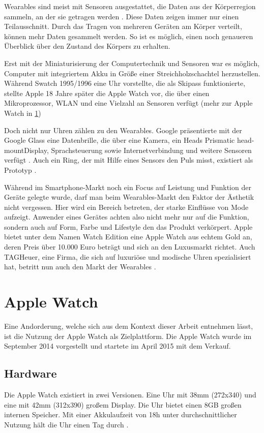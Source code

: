 Wearables sind meist mit Sensoren ausgestattet, die Daten aus der Körperregion sammeln, an der sie getragen werden \cite{4711366}. Diese Daten zeigen immer nur einen Teilausschnitt. Durch das Tragen von mehreren Geräten am Körper verteilt, können mehr Daten gesammelt werden. So ist es möglich, einen noch genaueren Überblick über den Zustand des Körpers zu erhalten\cite{4711366}.

Erst mit der Miniaturisierung der Computertechnik und Sensoren war es möglich, Computer mit integriertem Akku in Größe einer Streichholzschachtel herzustellen. Während Swatch 1995/1996 eine Uhr vorstellte, die als Skipass funktionierte, stellte Apple 18 Jahre später die Apple Watch vor, die über einen Mikroprozessor, WLAN und eine Vielzahl an Sensoren verfügt (mehr zur Apple Watch in \ref{ch:apple-watch})

Doch nicht nur Uhren zählen zu den Wearables. Google präsentierte mit der Google Glass eine Datenbrille, die über eine Kamera, ein Heads \glqq Prismatic head-mount\glqq  Display, Sprachsteuerung sowie Internetverbindung und weitere Sensoren verfügt \cite{Muensterer2014281}. Auch ein Ring, der mit Hilfe eines Sensors den Puls misst, existiert als Prototyp \cite{4711366}.

Während im Smartphone-Markt noch ein Focus auf Leistung und Funktion der Geräte gelegte wurde, darf man beim Wearables-Markt den Faktor der Ästhetik nicht vergessen. Hier wird ein Bereich betreten, der starke Einflüsse von Mode aufzeigt. Anwender eines Gerätes achten also nicht mehr nur auf die Funktion, sondern auch auf Form, Farbe und Lifestyle den das Produkt verkörpert. Apple bietet unter dem Namen \glqq Watch Edition \grqq eine Apple Watch aus echtem Gold an, deren Preis über 10.000 Euro beträgt und sich an den Luxusmarkt richtet. Auch TAGHeuer, eine Firma, die sich auf luxuriöse und modische Uhren spezialisiert hat, betritt nun auch den Markt der Wearables \cite{TAGHeuer:20015aa}.

\section{Apple Watch}
\label{ch:apple-watch}
Eine Andorderung, welche sich aus dem Kontext dieser Arbeit entnehmen lässt, ist die Nutzung der Apple Watch als Zielplattform. Die Apple Watch wurde im September 2014 vorgestellt und startete im April 2015 mit dem Verkauf.
\subsection{Hardware}
Die Apple Watch existiert in zwei Versionen. Eine Uhr mit 38mm (272x340) und eine mit 42mm (312x390) großem Display. Die Uhr bietet einen 8GB großen internen Speicher. Mit einer Akkulaufzeit von 18h unter durchschnittlicher Nutzung hält die Uhr einen Tag durch \cite{Riches:2015aa}. 
